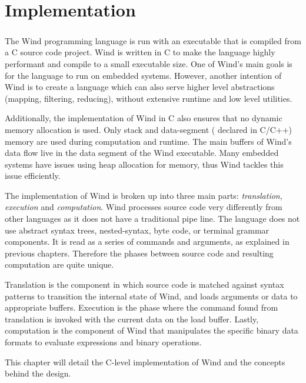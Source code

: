 
\chapter{Implementation}

\paragraph{  } The Wind programming language is run with an executable that is compiled from a C source code project. Wind is written in C to make the language highly performant and compile to a small executable size. One of Wind's main goals is for the language to run on embedded systems. However, another intention of Wind is to create a language which can also serve higher level abstractions (mapping, filtering, reducing), without extensive runtime and low level utilities.
\par Additionally, the implementation of Wind in C also ensures that no dynamic memory allocation is used. Only stack and data-segment ( declared in C/C++) memory are used during computation and runtime. The main buffers of Wind's data flow live in the data segment of the Wind executable. Many embedded systems have issues using heap allocation for memory, thus Wind tackles this issue efficiently.
\par The implementation of Wind is broken up into three main parts: \emph{translation}, \emph{execution} and \emph{computation}. Wind processes source code very differently from other languages as it does not have a traditional pipe line. The language does not use abstract syntax trees, nested-syntax, byte code,  or terminal grammar components. It is read as a series of commands and arguments, as explained in previous chapters. Therefore the phases between source code and resulting computation are quite unique. 
\par Translation is the component in which source code is matched against syntax patterns to transition the internal state of Wind, and loads arguments or data to appropriate buffers. Execution is the phase where the command found from translation is invoked with the current data on the load buffer. Lastly, computation is the component of Wind that manipulates the specific binary data formats to evaluate expressions and binary operations.
\par This chapter will detail the C-level implementation of Wind and the concepts behind the design.

